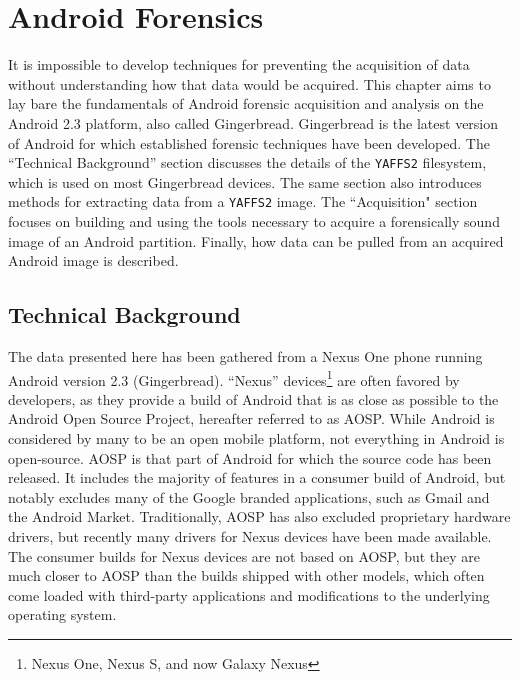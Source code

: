 \chapter{Android Forensics}
\label{ch:forensics}
It is impossible to develop techniques for preventing the acquisition of data without understanding how that data would be acquired.
This chapter aims to lay bare the fundamentals of Android forensic acquisition and analysis on the Android 2.3 platform, also called
Gingerbread. Gingerbread is the latest version of Android for which established forensic techniques have been developed.  The
``Technical Background'' section discusses the details of the \texttt{YAFFS2} filesystem, which is used on most Gingerbread devices.
The same section also introduces methods for extracting data from a \texttt{YAFFS2} image.  The ``Acquisition" section focuses on
building and using the tools necessary to acquire a forensically sound image of an Android partition.  Finally, how data can be
pulled from an acquired Android image is described.


\section{Technical Background}

The data presented here has been gathered from a Nexus One phone running Android version 2.3 (Gingerbread).  ``Nexus''
devices\footnote{Nexus One, Nexus S, and now Galaxy Nexus} are often favored by developers, as they provide a build of Android that
is as close as possible to the Android Open Source Project, hereafter referred to as AOSP. While Android is considered by many to be
an open mobile platform, not everything in Android is open-source. AOSP is that part of Android for which the source code has been
released.  It includes the majority of features in a consumer build of Android, but notably excludes many of the Google branded
applications, such as Gmail and the Android Market. Traditionally, AOSP has also excluded proprietary hardware drivers, but recently
many drivers for Nexus devices have been made available.  The consumer builds for Nexus devices are not based on AOSP, but they
are much closer to AOSP than the builds shipped with other models, which often come loaded with third-party applications and
modifications to the underlying operating system.

